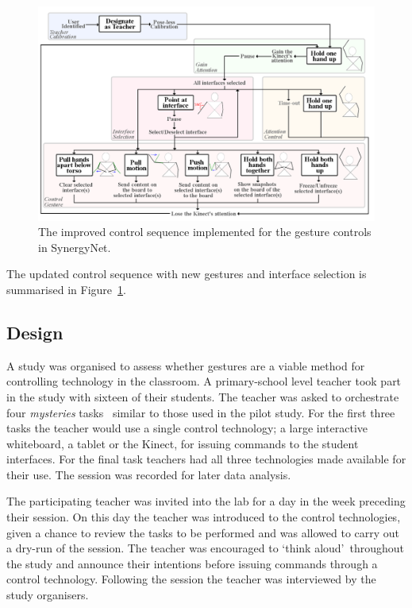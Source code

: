 \documentclass[link]{IWCOMP}
\begin{document}
\begin{figure}[t]
  \centering
  \includegraphics[width=1\textwidth]{figures/control_sequence_flow_diagram.png}
  \caption{The improved control sequence implemented for the gesture controls in SynergyNet.}
  \label{fig:controlSequenceFlowDiagram}
\end{figure}

The updated control sequence with new gestures and interface selection is summarised in Figure~\ref{fig:controlSequenceFlowDiagram}.

\subsection{Design}
\label{subsec:studyDesign}

A study was organised to assess whether gestures are a viable method for controlling technology in the classroom.
A primary-school level teacher took part in the study with sixteen of their students.
The teacher was asked to orchestrate four \textit{mysteries} tasks~\citep{AlAgha2010} similar to those used in the pilot study.
For the first three tasks the teacher would use a single control technology; a large interactive whiteboard, a tablet or the Kinect, for issuing commands to the student interfaces.
For the final task teachers had all three technologies made available for their use.
The session was recorded for later data analysis.

The participating teacher was invited into the lab for a day in the week preceding their session.
On this day the teacher was introduced to the control technologies, given a chance to review the tasks to be performed and was allowed to carry out a dry-run of the session.
The teacher was encouraged to \lq think aloud\rq\ throughout the study and announce their intentions before issuing commands through a control technology.
Following the session the teacher was interviewed by the study organisers.
\end{document}
